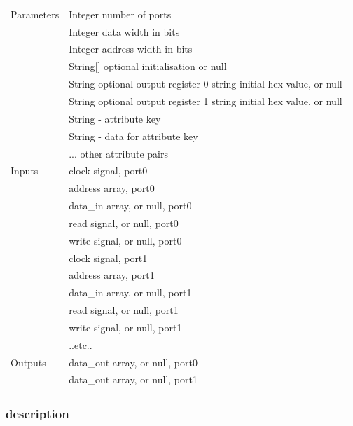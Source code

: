                 \begin{tabular}{| l | l |}
                \hline
                Parameters  & Integer number of ports \\
                            & Integer data width in bits \\
                            & Integer address width in bits \\
                            & String[] optional initialisation or null \\
                            & String optional output register 0 string initial hex value, or null \\
                            & String optional output register 1 string initial hex value, or null \\
                            & String - attribute key \\
                            & String - data for attribute key \\
                            &       ...     other attribute pairs \\
                \hline
                Inputs      & clock signal, port0 \\
                            & address array, port0 \\
                            & data\_in array, or null, port0 \\
                            & read signal, or null, port0 \\
                            & write signal, or null, port0 \\
                            & clock signal, port1 \\
                            & address array, port1 \\
                            & data\_in array, or null, port1 \\
                            & read signal, or null, port1 \\
                            & write signal, or null, port1 \\
                            & ..etc.. \\
                \hline
                Outputs     & data\_out array, or null, port0 \\
                            & data\_out array, or null, port1 \\
                \hline
                \end{tabular}

            \subsubsection{description}


